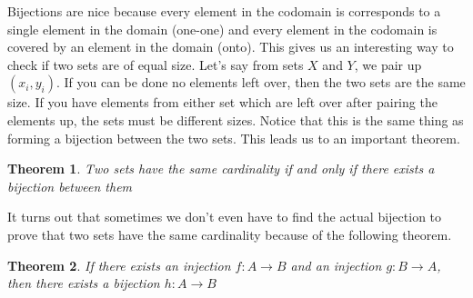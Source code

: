 \documentclass{article}
\newtheorem{theorem}{Theorem}
\begin{document}
Bijections are nice because every element in the codomain is corresponds to a single element in the domain (one-one)
and every element in the codomain is covered by an element in the domain (onto). This gives us an interesting way to 
check if two sets are of equal size. Let's say from sets $X$ and $Y$, we pair up $(x_i, y_i)$. If you can be done no 
elements left over, then the two sets are the same size. If you have elements from either set which are left over 
after pairing the elements up, the sets must be different sizes. Notice that this is the same thing as forming a bijection
between the two sets. This leads us to an important theorem.
\begin{theorem}
    Two sets have the same cardinality if and only if there exists a bijection between them
\end{theorem}
It turns out that sometimes we don't even have to find the actual bijection to prove that two sets have the same cardinality because of the following theorem.
\begin{theorem}
    If there exists an injection $f:A\rightarrow B$ and an injection $g:B\rightarrow A$, then
    there exists a bijection $h:A\rightarrow B$
\end{theorem}
\end{document}

